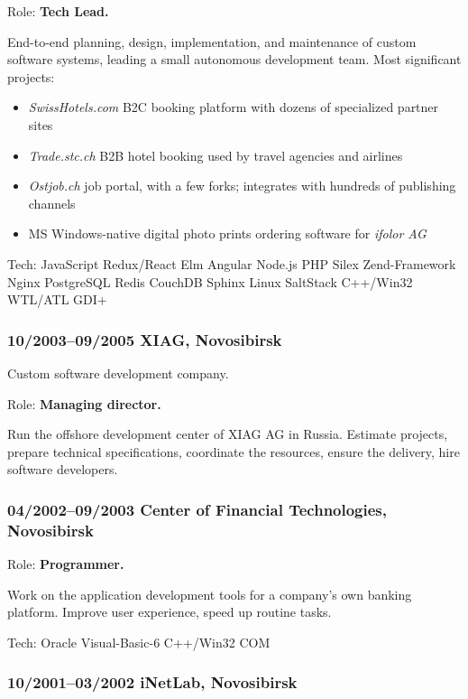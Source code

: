 \documentclass[a4paper, twocolumn, 10pt]{article}
\begin{document}
Role: \textbf{Tech Lead.}

End-to-end planning, design, implementation, and maintenance of custom software systems, leading a
small autonomous development team. Most significant projects:

\begin{itemize}
  \itemsep0em
  \item \emph{SwissHotels.com} B2C booking platform with dozens of specialized partner sites
  \item \emph{Trade.stc.ch} B2B hotel booking used by travel agencies and airlines
  \item \emph{Ostjob.ch} job portal, with a few forks; integrates with hundreds of publishing channels
  \item MS Windows-native digital photo prints ordering software for \emph{ifolor AG}
\end{itemize}

Tech: JavaScript Redux/React Elm Angular Node.js PHP Silex Zend-Framework Nginx PostgreSQL
Redis CouchDB Sphinx Linux SaltStack C++/Win32 WTL/ATL GDI+

\subsubsection*{10/2003--09/2005 XIAG, Novosibirsk}

Custom software development company.

Role: \textbf{Managing director.}

Run the offshore development center of XIAG AG in Russia. Estimate projects, prepare technical
specifications, coordinate the resources, ensure the delivery, hire software developers.

\subsubsection*{04/2002--09/2003 Center of Financial Technologies, Novosibirsk}

Role: \textbf{Programmer.}

Work on the application development tools for a company's own banking platform. Improve user
experience, speed up routine tasks.

Tech: Oracle Visual-Basic-6 C++/Win32 COM

\subsubsection*{10/2001--03/2002 iNetLab, Novosibirsk}
\end{document}
